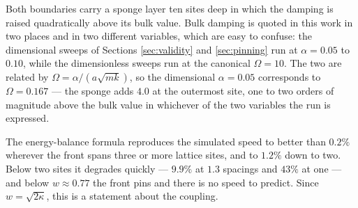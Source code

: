 
Both boundaries carry a sponge layer ten sites deep in which the damping is raised
quadratically above its bulk value. Bulk damping is quoted in this work in two
places and in two different variables, which are easy to confuse: the dimensional
sweeps of Sections \ref{sec:validity} and \ref{sec:pinning} run at
$\alpha = 0.05$ to $0.10$, while the dimensionless sweeps run at the canonical
$\Omega = 10$. The two are related by $\Omega = \alpha/(a\sqrt{mk})$, so the
dimensional $\alpha = 0.05$ corresponds to $\Omega = 0.167$ --- the sponge adds
$4.0$ at the outermost site, one to two orders of magnitude above the bulk value in
whichever of the two variables the run is expressed.

%
%

The energy-balance formula reproduces the simulated speed to better than
$0.2\%$ wherever the front spans three or more lattice sites, and to $1.2\%$ down
to two. Below two sites it degrades quickly --- $9.9\%$ at $1.3$ spacings and
$43\%$ at one --- and below $w \approx 0.77$ the front pins and there is no speed
to predict. Since $w = \sqrt{2\kappa}$, this is a statement about the coupling.

